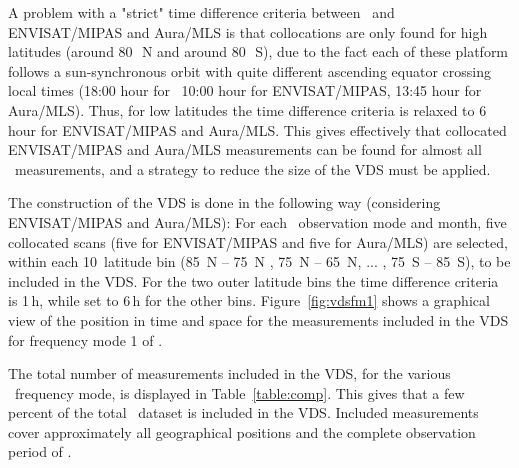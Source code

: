 A problem with a "strict" time difference criteria
between \smr\ and  ENVISAT/MIPAS and Aura/MLS
is that collocations are only found for high latitudes
 (around 80\,\degree\ N and around 80\,\degree\ S),
due to the fact each of these platform follows a sun-synchronous orbit
with quite different ascending equator crossing local times  
(18:00 hour for \smr\, 10:00 hour for ENVISAT/MIPAS,
 13:45 hour for Aura/MLS). 
Thus, for low latitudes the time difference criteria
is relaxed to 6\,hour for ENVISAT/MIPAS and Aura/MLS.
This gives effectively that collocated ENVISAT/MIPAS and Aura/MLS 
measurements can be found for almost all \smr\ measurements, and a strategy
to reduce the size of the VDS must be applied.

The construction of the VDS is done in the following way (considering ENVISAT/MIPAS and Aura/MLS):
For each \smr\ observation mode and month, five collocated scans
(five for ENVISAT/MIPAS and five for Aura/MLS)  
are selected, within each 10\degree\ latitude bin
(85\degree\ N -- 75\degree\ N , 75\degree\ N -- 65\degree\ N, ... , 75\degree\ S -- 85\degree\ S),
to be included in the VDS. For the two outer latitude bins the
time difference criteria is 1\,h, while set to 6\,h for the other bins.  
Figure~\ref{fig:vdsfm1} shows a graphical view of the position in
time and space for the measurements included in the VDS for
frequency mode 1 of \smr.   

The total number of measurements included in the VDS, for the various \smr\ frequency mode,
is displayed in Table~\ref{table:comp}. This gives that a few percent of the total \smr\
dataset is included in the VDS. Included measurements cover approximately 
all geographical positions and the complete observation period of \smr. 






